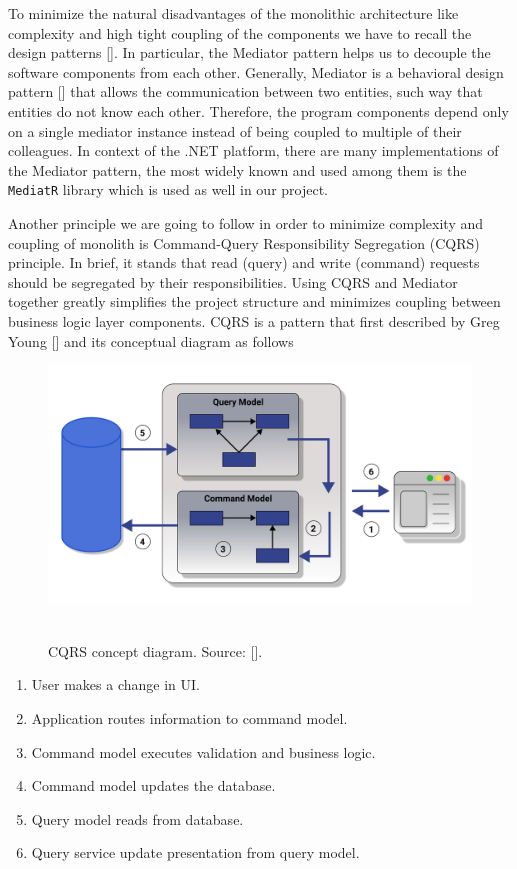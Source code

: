 To minimize the natural disadvantages of the monolithic architecture like complexity and high tight coupling of the components
we have to recall the design patterns [\cite{rising1998design}].
In particular, the Mediator pattern helps us to decouple the software components from each other.
Generally, Mediator is a behavioral design pattern [\cite{rasche2016building}] that allows the communication between two entities,
such way that entities do not know each other.
Therefore, the program components depend only on a single mediator instance instead of being coupled to multiple of their
colleagues.
In context of the .NET platform, there are many implementations of the Mediator pattern,
the most widely known and used among them is the \texttt{MediatR} library which is used as well in our project.

Another principle we are going to follow in order to minimize complexity and coupling of monolith is Command-Query
Responsibility Segregation (CQRS) principle.
In brief, it stands that read (query) and write (command) requests should be segregated by their responsibilities.
Using CQRS and Mediator together greatly simplifies the project structure and minimizes coupling between business
logic layer components.
CQRS is a pattern that first described by Greg Young [\cite{young2010cqrs}] and its conceptual diagram as follows

\begin{figure}[H]
    \centering
    \includegraphics[width=1\textwidth]{Pictures/05_CQRS_concept_diagram}
    ~\caption{CQRS concept diagram. Source: [\cite{fowler2011cqrs}].}
    \label{fig:figure}
\end{figure}

\begin{enumerate}
    \item User makes a change in UI\@.
    \item Application routes information to command model.
    \item Command model executes validation and business logic.
    \item Command model updates the database.
    \item Query model reads from database.
    \item Query service update presentation from query model.
\end{enumerate}